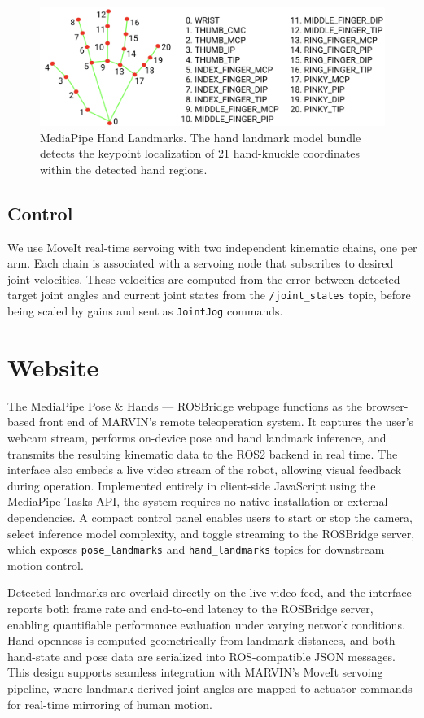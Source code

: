 \documentclass[manuscript,screen]{acmart} %
\begin{document}
\begin{figure}[htbp]
  \centering
  \includegraphics[width=0.5\linewidth]{assets/hand-landmarks.png}
  \caption{MediaPipe Hand Landmarks. The hand landmark model bundle detects the keypoint localization of 21 hand-knuckle coordinates within the detected hand regions.}
  \label{fig:hand-landmarks}
\end{figure}

\subsection{Control}
We use MoveIt real-time servoing with two independent kinematic chains, one per arm. 
Each chain is associated with a servoing node that subscribes to desired joint 
velocities. These velocities are computed from the error between detected 
target joint angles and current joint states from the \texttt{/joint\_states} 
topic, before being scaled by gains and sent as \texttt{JointJog} commands.

\section{Website}
The MediaPipe Pose \& Hands — ROSBridge webpage functions as the browser-based 
front end of MARVIN’s remote teleoperation system. It captures the user’s webcam 
stream, performs on-device pose and hand landmark inference, and transmits the 
resulting kinematic data to the ROS2 backend in real time. The interface also 
embeds a live video stream of the robot, allowing visual feedback during operation. 
Implemented entirely in client-side JavaScript using the MediaPipe Tasks API, 
the system requires no native installation or external dependencies. 
A compact control panel enables users to start or stop the camera, select inference 
model complexity, and toggle streaming to the ROSBridge server, which exposes 
\texttt{pose\_landmarks} and \texttt{hand\_landmarks} topics for downstream 
motion control.

Detected landmarks are overlaid directly on the live video feed, and the interface 
reports both frame rate and end-to-end latency to the ROSBridge server, enabling 
quantifiable performance evaluation under varying network conditions. Hand 
openness is computed geometrically from landmark distances, and both hand-state 
and pose data are serialized into ROS-compatible JSON messages. This design 
supports seamless integration with MARVIN’s MoveIt servoing pipeline, where 
landmark-derived joint angles are mapped to actuator commands for real-time 
mirroring of human motion.
\end{document}

